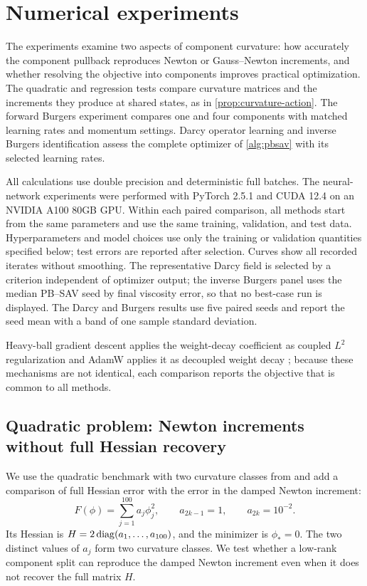 \section{Numerical experiments}
\label{sec:experiments}

The experiments examine two aspects of component curvature: how accurately the
component pullback reproduces Newton or Gauss--Newton increments, and whether
resolving the objective into components improves practical optimization. The
quadratic and regression tests compare curvature matrices and the increments
they produce at shared states, as in \cref{prop:curvature-action}. The forward
Burgers experiment compares one and four components with matched learning rates
and momentum settings. Darcy operator learning and inverse Burgers
identification assess the complete optimizer of \cref{alg:pbsav} with its
selected learning rates.

All calculations use double precision and deterministic full batches.  The
neural-network experiments were performed with PyTorch 2.5.1 and CUDA 12.4 on
an NVIDIA A100 80GB GPU.  Within each paired comparison, all methods start from
the same parameters and use the same training, validation, and test data.
Hyperparameters and model choices use only the training or validation
quantities specified below; test errors are reported after selection.  Curves
show all recorded iterates without smoothing.  The representative Darcy field
is selected by a criterion independent of optimizer output; the inverse Burgers
panel uses the median PB--SAV seed by final viscosity error, so that no
best-case run is displayed.  The Darcy and Burgers results use five paired
seeds and report the seed mean with a band of one sample standard deviation.

Heavy-ball gradient descent applies the weight-decay coefficient as coupled
\(L^2\) regularization and AdamW applies it as decoupled weight decay
\cite{loshchilov2019adamw}; because these mechanisms are not identical, each
comparison reports the objective that is common to all methods.

\subsection{Quadratic problem: Newton increments without full Hessian recovery}
\label{sec:quadratic-experiment}

We use the quadratic benchmark with two curvature classes from
\cite{zhang2026pbsav} and add a comparison of full Hessian error with the
error in the damped Newton increment:
\begin{equation}
  F(\phi)=\sum_{j=1}^{100}a_j\phi_j^2,
  \qquad
  a_{2k-1}=1,
  \qquad
  a_{2k}=10^{-2}.
  \label{eq:quadratic-problem}
\end{equation}
Its Hessian is \(H=2\operatorname{diag}(a_1,\ldots,a_{100})\), and the minimizer is
\(\phi_*=0\).  The two distinct values of \(a_j\)
form two curvature classes.  We test whether a
low-rank component split can reproduce the damped Newton increment even when it
does not recover the full matrix \(H\).

